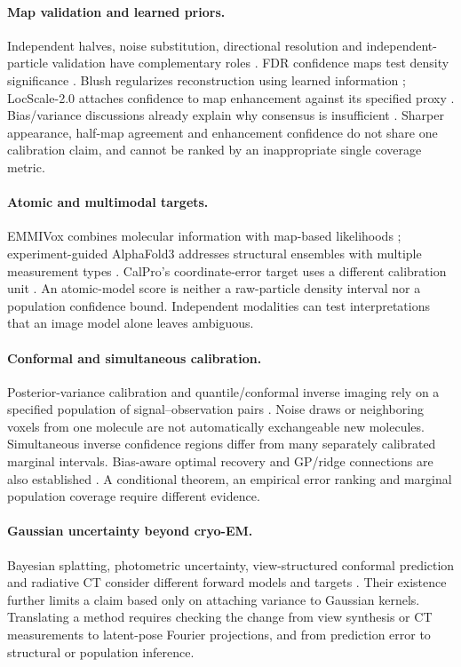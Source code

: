 \paragraph{Map validation and learned priors.}
Independent halves, noise substitution, directional resolution and
independent-particle validation have complementary roles
\citep{schereschen2012,chen2013,monodir2020,independent2020}.
FDR confidence maps test density significance \citep{beckers2019,beckers2020}.
Blush regularizes reconstruction using learned information
\citep{blush2024}; LocScale-2.0 attaches confidence to map enhancement
against its specified proxy \citep{locscale2026}. Bias/variance discussions
already explain why consensus is insufficient \citep{sorzano2022}.
Sharper appearance, half-map agreement and enhancement confidence do not
share one calibration claim, and cannot be ranked by an inappropriate
single coverage metric.

\paragraph{Atomic and multimodal targets.}
EMMIVox combines molecular information with map-based likelihoods
\citep{emmivox2024}; experiment-guided AlphaFold3 addresses structural
ensembles with multiple measurement types \citep{guidedaf32026}.
CalPro's coordinate-error target uses a different calibration unit
\citep{calpro2026}. An atomic-model score is neither a raw-particle density
interval nor a population confidence bound. Independent modalities can
test interpretations that an image model alone leaves ambiguous.

\paragraph{Conformal and simultaneous calibration.}
Posterior-variance calibration and quantile/conformal inverse imaging rely
on a specified population of signal--observation pairs
\citep{narnhofer2024,qutcc2026}. Noise draws or neighboring voxels from one
molecule are not automatically exchangeable new molecules. Simultaneous
inverse confidence regions \citep{batlle2025} differ from many separately
calibrated marginal intervals. Bias-aware optimal recovery and GP/ridge
connections are also established \citep{donoho1994,armstrong2018,kanagawa2025}.
A conditional theorem, an empirical error ranking and marginal population
coverage require different evidence.

\paragraph{Gaussian uncertainty beyond cryo-EM.}
Bayesian splatting, photometric uncertainty, view-structured conformal
prediction and radiative CT consider different forward models and targets
\citep{jia2026bayesiangs,galappaththige2026ppu,chu2026viewcp,zhao2026radiative}.
Their existence further limits a claim based only on attaching variance
to Gaussian kernels. Translating a method requires checking the change from
view synthesis or CT measurements to latent-pose Fourier projections, and
from prediction error to structural or population inference.

